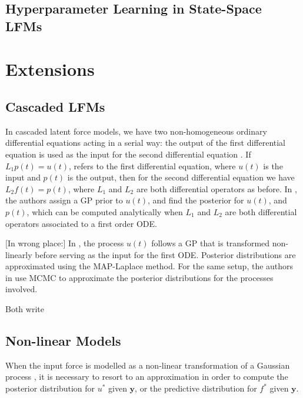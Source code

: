\documentclass[journal]{IEEEtran}
\newcommand{\simo}[1]{{\color{red}#1}}
\begin{document}
\subsection{Hyperparameter Learning in State-Space LFMs}


\section{Extensions}

\subsection{Cascaded LFMs}

In cascaded latent force models, we have two non-homogeneous ordinary differential equations acting in a serial way:
the output of the first differential equation is used as the input for the second differential equation
\cite{Honkela:PNAS10}. If $L_1p(t) = u(t)$, refers to the first differential equation,
where $u(t)$ is the input and $p(t)$ is the output, then for the second differential equation we have $L_2f(t) = p(t)$,
where $L_1$ and $L_2$ are both differential operators as before. In \cite{Honkela:PNAS10}, the authors assign a
GP prior to $u(t)$, and find the posterior for $u(t)$, and $p(t)$, which can be computed analytically when $L_1$ and $L_2$
are both differential operators associated to a first order ODE.

\simo{[In wrong place:] In \cite{Gao:latent08}, the process $u(t)$ follows
a GP that is transformed non-linearly before serving as the input for the first ODE. Posterior distributions are
approximated using the MAP-Laplace method. For the same setup, the authors in \cite{Titsias:BMC:2012} use MCMC to
approximate the posterior distributions for the processes involved.}


\simo{Both write}

\subsection{Non-linear Models}

When the input force is modelled as a non-linear transformation of a Gaussian process \cite{Lawrence:gpsim2007a,
Gao:latent08, Titsias:BMC:2012}, it is necessary to resort to an approximation in order to compute the posterior
distribution for $u^*$ given $\mathbf{y}$, or the predictive distribution for $f^*$ given $\mathbf{y}$.
\end{document}
